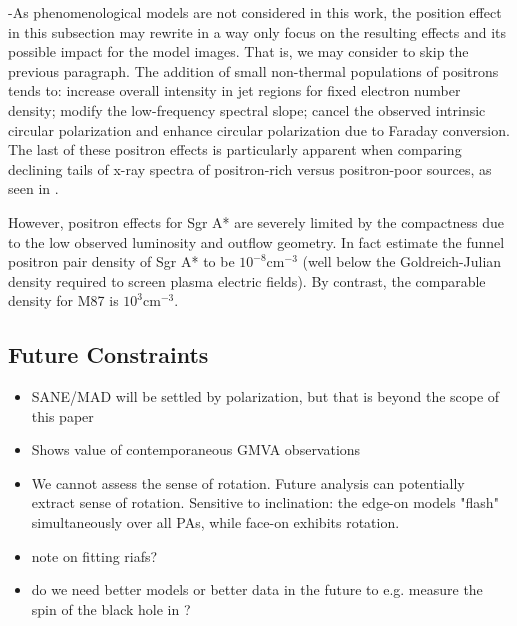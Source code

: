 \hyp{As phenomenological models are not considered in this work, the position effect in this subsection may rewrite in a way only focus on the resulting effects and its possible impact for the model images. That is, we may consider to skip the previous paragraph.}
The addition of small non-thermal populations of positrons \citep{2020ApJ...896...30A,2021arXiv210105327E} tends to: increase overall intensity in jet regions for fixed electron number density; modify the low-frequency spectral slope; cancel the observed intrinsic circular polarization and enhance circular polarization due to Faraday conversion. The last of these positron effects is particularly apparent when comparing declining tails of x-ray spectra of positron-rich versus positron-poor sources, as seen in \cite{2021arXiv210105327E}.%

However, positron effects for Sgr A* are severely limited by the compactness \citep{2012MNRAS.424L..26G} due to the low observed luminosity and outflow geometry. In fact \cite{2011ApJ...735....9M} estimate the funnel positron pair density of Sgr A* to be $10^{-8}\mathrm{cm}^{-3}$ (well below the Goldreich-Julian density required to screen plasma electric fields). By contrast, the comparable density for M87 is $10^3\mathrm{cm}^{-3}$.




\subsection{Future Constraints}\label{sec:future}

\begin{itemize}

\item SANE/MAD will be settled by polarization, but that is beyond the scope of this paper

\item Shows value of contemporaneous GMVA observations

\item We cannot assess the sense of rotation.
Future analysis can potentially extract sense of rotation.  Sensitive to inclination: the edge-on models "flash" simultaneously over all PAs, while face-on exhibits rotation.

\item note on fitting riafs?

\item do we need better models or better data in the future to e.g. measure the spin of the black hole in \sgra?

\end{itemize}
